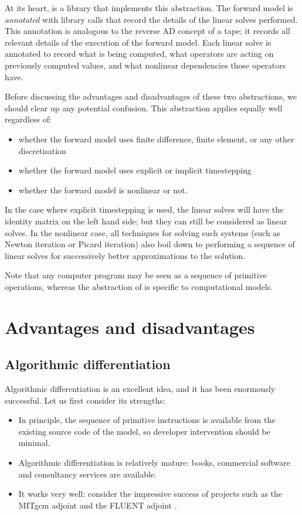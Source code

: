 At its heart, \libadjoint is a library that implements this abstraction. The
forward model is \emph{annotated} with library calls that record the details
of the linear solves performed. This annotation is analogous to the reverse
AD concept of a tape; it records all relevant details of the execution of
the forward model. Each linear solve is annotated to record what is being
computed, what operators are acting on previously computed values, and what
nonlinear dependencies those operators have.

Before discussing the advantages and disadvantages of these two abstractions, 
we should clear up any potential confusion. This abstraction applies equally
well regardless of:
\begin{itemize}
\item whether the forward model uses finite difference, finite
element, or any other discretisation
\item whether the forward model uses explicit or implicit timestepping
\item whether the forward model is nonlinear or not.
\end{itemize}

In the case where explicit timestepping is used, the linear solves
will have the identity matrix on the left hand side; but they can still
be considered as linear solves. In the nonlinear case, all techniques for
solving such systems (such as Newton iteration or Picard iteration) also
boil down to performing a sequence of linear solves for successively better
approximations to the solution.

Note that any computer program may be seen as a sequence of primitive operations, 
whereas the abstraction of \libadjoint is specific to computational models.

\section{Advantages and disadvantages}
\subsection{Algorithmic differentiation}
Algorithmic differentiation is an excellent idea, and it has been enormously
successful. Let us first consider its strengths:
\begin{itemize}
\item In principle, the sequence of primitive instructions is available from
the existing source code of the model, so developer intervention should
be minimal.
\item Algorithmic differentiation is relatively mature: books, commercial
software and consultancy services are available.
\item It works very well: consider the impressive success of projects such as the
MITgcm adjoint \citep{heimbach2002,heimbach2005} and the FLUENT adjoint \citep{bischof2007}.
\end{itemize}

